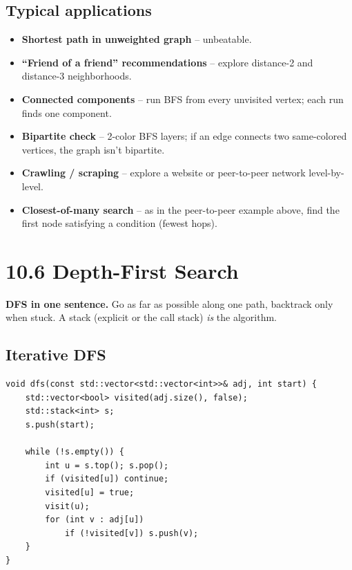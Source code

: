 \documentclass[11pt]{article}
\begin{document}
\subsection*{Typical applications}

\begin{itemize}[leftmargin=*]
    \item \textbf{Shortest path in unweighted graph} -- unbeatable.
    \item \textbf{``Friend of a friend'' recommendations} -- explore distance-2 and distance-3 neighborhoods.
    \item \textbf{Connected components} -- run BFS from every unvisited vertex; each run finds one component.
    \item \textbf{Bipartite check} -- 2-color BFS layers; if an edge connects two same-colored vertices, the graph isn't bipartite.
    \item \textbf{Crawling / scraping} -- explore a website or peer-to-peer network level-by-level.
    \item \textbf{Closest-of-many search} -- as in the peer-to-peer example above, find the first node satisfying a condition (fewest hops).
\end{itemize}

\section{10.6 Depth-First Search}

\begin{ideabox}
\textbf{DFS in one sentence.} Go as far as possible along one path, backtrack only when stuck. A stack (explicit or the call stack) \emph{is} the algorithm.
\end{ideabox}

\subsection*{Iterative DFS}

\begin{lstlisting}[basicstyle=\ttfamily\small,frame=single]
void dfs(const std::vector<std::vector<int>>& adj, int start) {
    std::vector<bool> visited(adj.size(), false);
    std::stack<int> s;
    s.push(start);

    while (!s.empty()) {
        int u = s.top(); s.pop();
        if (visited[u]) continue;
        visited[u] = true;
        visit(u);
        for (int v : adj[u])
            if (!visited[v]) s.push(v);
    }
}
\end{lstlisting}
\end{document}
